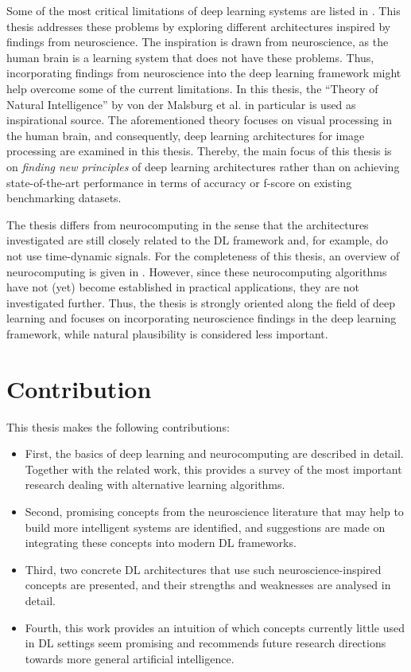 Some of the most critical limitations of deep learning systems are listed in .
This thesis addresses these problems by exploring different architectures inspired by findings from neuroscience.
The inspiration is drawn from neuroscience, as the human brain is a learning system that does not have these problems. Thus, incorporating findings from neuroscience into the deep learning framework might help overcome some of the current limitations.
In this thesis, the ``Theory of Natural Intelligence'' by von der Malsburg et al.  in particular is used as inspirational source.
The aforementioned theory focuses on visual processing in the human brain, and consequently, deep learning architectures for image processing are examined in this thesis.
Thereby, the main focus of this thesis is on \emph{finding new principles} of deep learning architectures rather than on achieving state-of-the-art performance in terms of accuracy or f-score on existing benchmarking datasets.

The thesis differs from neurocomputing in the sense that the architectures investigated are still closely related to the DL framework and, for example, do not use time-dynamic signals. 
For the completeness of this thesis, an overview of neurocomputing is given in .
However, since these neurocomputing algorithms have not (yet) become established in practical applications, they are not investigated further.
Thus, the thesis is strongly oriented along the field of deep learning and focuses on incorporating neuroscience findings in the deep learning framework, while natural plausibility is considered less important.

\section{Contribution}
This thesis makes the following contributions:
\begin{itemize}
	\item First, the basics of deep learning and neurocomputing are described in detail. Together with the related work, this provides a survey of the most important research dealing with alternative learning algorithms.
	\item Second, promising concepts from the neuroscience literature that may help to build more intelligent systems are identified, and suggestions are made on integrating these concepts into modern DL frameworks.
	\item Third, two concrete DL architectures that use such neuroscience-inspired concepts are presented, and their strengths and weaknesses are analysed in detail.
	\item Fourth, this work provides an intuition of which concepts currently little used in DL settings seem promising and recommends future research directions towards more general artificial intelligence.
\end{itemize}


